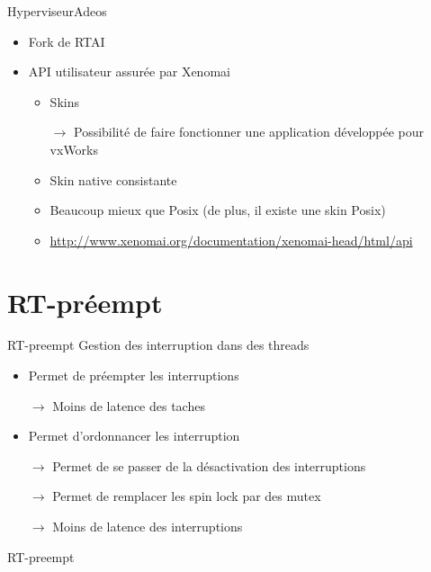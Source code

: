 \begin{frame}{Hyperviseur}{Adeos}
  \begin{itemize}
    \item Fork de RTAI
    \item API utilisateur assurée par Xenomai
    \begin{itemize}
      \item Skins
      \item[$\to$]  Possibilité de  faire fonctionner  une application
        développée pour vxWorks
      \item Skin native consistante
      \item Beaucoup mieux que Posix (de plus, il existe une skin Posix)
      \item \url{http://www.xenomai.org/documentation/xenomai-head/html/api}
    \end{itemize}
  \end{itemize}
\end{frame}

\section{RT-préempt} %

\begin{frame}{RT-preempt} %
  Gestion des interruption dans des threads
  \begin{itemize}
    \item Permet de préempter les interruptions
    \item[$\to$] Moins de latence des taches
    \item Permet d'ordonnancer les interruption
    \item[$\to$] Permet de se passer de la désactivation des interruptions
    \item[$\to$] Permet de remplacer les spin lock par des mutex
    \item[$\to$] Moins de latence des interruptions
  \end{itemize}
\end{frame}

\begin{frame}{RT-preempt}
  \begin{center}
    
  \end{center}
\end{frame}

